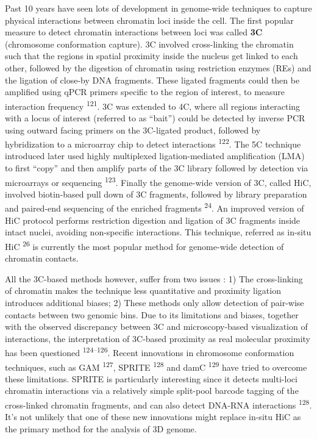\documentclass[11pt,twoside]{MPIthesis}
\theoremstyle{definition}
\theoremstyle{definition}
\theoremstyle{definition}
\theoremstyle{remark}
\begin{document}
Past 10 years have seen lots of development in genome-wide techniques to
capture physical interactions between chromatin loci inside the cell.
The first popular measure to detect chromatin interactions between loci
was called \textbf{3C} (chromosome conformation capture). 3C involved
cross-linking the chromatin such that the regions in spatial proximity
inside the nucleus get linked to each other, followed by the digestion
of chromatin using restriction enzymes (REs) and the ligation of
close-by DNA fragments. These ligated fragments could then be amplified
using qPCR primers specific to the region of interest, to measure
interaction frequency \textsuperscript{121}. 3C was extended to 4C,
where all regions interacting with a locus of interest (referred to as
``bait'') could be detected by inverse PCR using outward facing primers
on the 3C-ligated product, followed by hybridization to a microarray
chip to detect interactions \textsuperscript{122}. The 5C technique
introduced later used highly multiplexed ligation-mediated amplification
(LMA) to first ``copy'' and then amplify parts of the 3C library
followed by detection via microarrays or sequencing
\textsuperscript{123}. Finally the genome-wide version of 3C, called
HiC, involved biotin-based pull down of 3C fragments, followed by
library preparation and paired-end sequencing of the enriched fragments
\textsuperscript{24}. An improved version of HiC protocol performs
restriction digestion and ligation of 3C fragments inside intact nuclei,
avoiding non-specific interactions. This technique, referred as in-situ
HiC \textsuperscript{26} is currently the most popular method for
genome-wide detection of chromatin contacts.

All the 3C-based methods however, suffer from two issues : 1) The
cross-linking of chromatin makes the technique less quantitative and
proximity ligation introduces additional biases; 2) These methods only
allow detection of pair-wise contacts between two genomic bins. Due to
its limitations and biases, together with the observed discrepancy
between 3C and microscopy-based visualization of interactions, the
interpretation of 3C-based proximity as real molecular proximity has
been questioned \textsuperscript{124--126}. Recent innovations in
chromosome conformation techniques, such as GAM \textsuperscript{127},
SPRITE \textsuperscript{128} and damC \textsuperscript{129} have tried
to overcome these limitations. SPRITE is particularly interesting since
it detects multi-loci chromatin interactions via a relatively simple
split-pool barcode tagging of the cross-linked chromatin fragments, and
can also detect DNA-RNA interactions \textsuperscript{128}. It's not
unlikely that one of these new innovations might replace in-situ HiC as
the primary method for the analysis of 3D genome.
\end{document}
